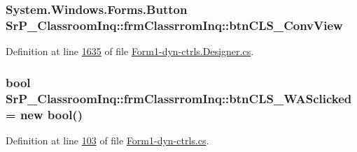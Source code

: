 \hypertarget{class_sr_p___classroom_inq_1_1frm_classrrom_inq_a2e74908e00f7502b511e8726d1574d7e}{
\subsubsection[{btn\-C\-L\-S\-\_\-\-Conv\-View}]{\setlength{\rightskip}{0pt plus 5cm}\-System.\-Windows.\-Forms.\-Button {\bf \-Sr\-P\-\_\-\-Classroom\-Inq\-::frm\-Classrrom\-Inq\-::btn\-C\-L\-S\-\_\-\-Conv\-View}}}
\label{class_sr_p___classroom_inq_1_1frm_classrrom_inq_a2e74908e00f7502b511e8726d1574d7e}


\-Definition at line \hyperlink{_form1-dyn-ctrls_8_designer_8cs_source_l01635}{1635} of file \hyperlink{_form1-dyn-ctrls_8_designer_8cs_source}{\-Form1-\/dyn-\/ctrls.\-Designer.\-cs}.

\hypertarget{class_sr_p___classroom_inq_1_1frm_classrrom_inq_aed9d1ad7c4e2b196997c1820ac2cdb4d}{
\subsubsection[{btn\-C\-L\-S\-\_\-\-W\-A\-Sclicked}]{\setlength{\rightskip}{0pt plus 5cm}bool {\bf \-Sr\-P\-\_\-\-Classroom\-Inq\-::frm\-Classrrom\-Inq\-::btn\-C\-L\-S\-\_\-\-W\-A\-Sclicked} = new bool()}}
\label{class_sr_p___classroom_inq_1_1frm_classrrom_inq_aed9d1ad7c4e2b196997c1820ac2cdb4d}


\-Definition at line \hyperlink{_form1-dyn-ctrls_8cs_source_l00103}{103} of file \hyperlink{_form1-dyn-ctrls_8cs_source}{\-Form1-\/dyn-\/ctrls.\-cs}.

